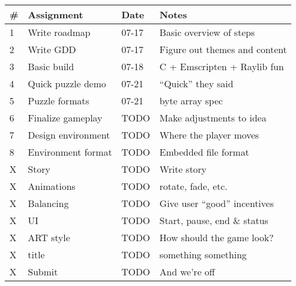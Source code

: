 \documentclass[12pt, letterpaper]{article}
\begin{document}
\bgroup
\def\arraystretch{1.5}
\begin{tabular}{ R{0.4cm} p{4cm} p{1.5cm} p{5.5cm} }
\toprule
{} & \textbf{Assignment} & \textbf{Date} & \textbf{Notes} \\ 
 & Write roadmap & 07-17 & Basic overview of steps \\
2 & Write GDD & 07-17 & Figure out themes and content \\
3 & Basic build & 07-18 & C + Emscripten + Raylib fun \\
4 & Quick puzzle demo & 07-21 & ``Quick'' they said \\
5 & Puzzle formats & 07-21 & byte array spec \\
6 & Finalize gameplay & TODO & Make adjustments to idea \\
7 & Design environment & TODO & Where the player moves \\
8 & Environment format & TODO & Embedded file format \\

X & Story & TODO & Write story \\
X & Animations & TODO & rotate, fade, etc. \\
X & Balancing & TODO & Give user ``good'' incentives \\
X & UI & TODO & Start, pause, end \& status \\
X & ART style & TODO & How should the game look? \\
X & title & TODO & something something \\
X & Submit & TODO & And we're off \\

\bottomrule
\end{tabular}
\egroup
\end{document}
